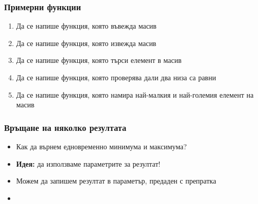 \documentclass[alsotrans]{beamerswitch}
\begin{document}
\begin{frame}
  \frametitle{Примерни функции}

  \begin{enumerate}[<+->]
  \item Да се напише функция, която въвежда масив
  \item Да се напише функция, която извежда масив
  \item Да се напише функция, която търси елемент в масив
  \item Да се напише функция, която проверява дали два низа са равни
  \item Да се напише функция, която намира най-малкия и най-големия елемент на масив
  \end{enumerate}
\end{frame}

\begin{frame}
  \frametitle{Връщане на няколко резултата}

  \begin{itemize}[<+->]
  \item Как да върнем едновременно минимума и максимума?
  \item \textbf{Идея:} да използваме параметрите за резултат!
  \item Можем да запишем резултат в параметър, предаден с препратка
  \item {}
  \end{itemize}
\end{frame}
\end{document}
